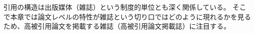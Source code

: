 引用の構造は出版媒体（雑誌）という制度的単位とも深く関係している。
そこで本章では論文レベルの特性が雑誌という切り口ではどのように現れるかを見るため、高被引用論文を掲載する雑誌（高被引用論文掲載誌）に注目する。

